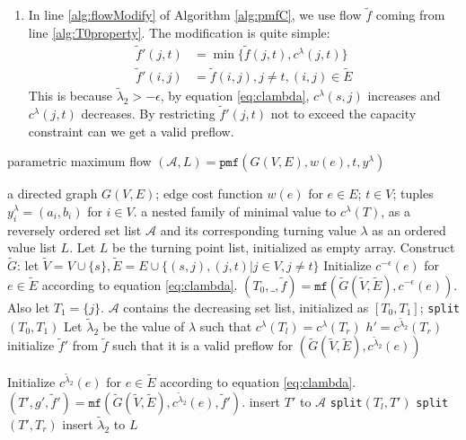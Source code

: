 \documentclass{article}
\begin{document}
\begin{enumerate}
\begin{proof}
By deduction, we conclude equation \eqref{eq:solutionProperty} holds and line \eqref{findLambda} always has solution.
\end{proof}
\item In line \ref{alg:flowModify} of Algorithm \ref{alg:pmfC}, we use flow $\tilde{f}$ coming from line \ref{alg:T0property}. The modification is quite simple:
\begin{align}
\tilde{f}'(j,t) &= \min\{\tilde{f}(j,t), c^{\lambda}(j,t) \} \\
\tilde{f}'(i,j) &= \tilde{f}(i,j), j \neq t, (i,j) \in \widetilde{E}
\end{align}
This is because $\tilde{\lambda}_2 > -\epsilon$, by equation \eqref{eq:clambda}, $c^{\lambda}(s,j)$ increases and $c^{\lambda} (j,t)$ decreases. By restricting $\tilde{f}'(j,t)$ not to exceed the capacity constraint can we get a valid preflow.
\end{enumerate}

\begin{algorithm}
	\caption{parametric maximum flow $(\mathcal{A}, L) = \texttt{pmf}(G(V,E), w(e), t, y^{\lambda})$}\label{alg:pmfC}
	\begin{algorithmic}[1]
		\REQUIRE a directed graph $G(V, E)$;  edge cost function $w(e)$ for $e \in E$; $t \in V$; tuples $y^{\lambda}_i = (a_i, b_i)$ for $i \in V$.
		\ENSURE a nested family of minimal value to $c^{\lambda}(T)$, as a reversely ordered set list $\mathcal{A}$ and its corresponding turning value $\lambda$ as an ordered value list $L$.
		\STATE Let $L$ be the turning point list, initialized as empty array.
		\STATE Construct $\widetilde{G}$: let $\widetilde{V}=V\cup\{s\}, \widetilde{E} = E\cup \{(s,j),(j,t)|j \in V, j\neq t\}$
		\STATE Initialize $c^{-\epsilon}(e)$ for $e \in \widetilde{E}$ according to equation \eqref{eq:clambda}.
		\STATE $ (T_0, \_, \tilde{f})  = \mathtt{mf}(\widetilde{G}(\widetilde{V}, \widetilde{E}), c^{-\epsilon}(e))$. Also let $T_1 = \{j\}$. \label{alg:T0property}
		\STATE $\mathcal{A}$ contains the decreasing set list, initialized as $[T_0, T_1]$;
		\STATE \texttt{split}$( T_0, T_1)$
		\STATE Let $\tilde{\lambda}_2$ be the value of $\lambda$ such that $c^{\lambda}(  T_l) = 
		c^{\lambda}(T_r)$ \label{findLambda}
		\STATE $h' = c^{\tilde{\lambda}_2}(T_r) $
		\STATE initialize $\tilde{f}'$ from $\tilde{f}$ such that it is a valid preflow for $(\widetilde{G}(\widetilde{V}, \widetilde{E}), c^{\tilde{\lambda}_2}(e))$ \label{alg:flowModify}

		\STATE Initialize $c^{\tilde{\lambda}_2}(e)$ for $e \in \widetilde{E}$ according to equation \eqref{eq:clambda}.
		\STATE $(T', g', \tilde{f}') = \mathtt{mf}(\widetilde{G}(\widetilde{V}, \widetilde{E}), c^{\tilde{\lambda}_2}(e), \tilde{f}')$.
		 \label{alg:lineLarge}
		\STATE insert $T'$ to $\mathcal{A}$
		\STATE \texttt{split}$(T_l, T')$
		\STATE \texttt{split}$(T', T_r)$
		\ELSE
		\STATE insert $\tilde{\lambda}_2$ to $L$
		\ENDIF
		\ENDFUNCTION
	\end{algorithmic}
\end{algorithm}
\end{document}
